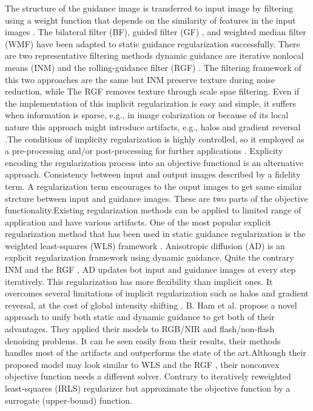 \documentclass[10pt,twocolumn,letterpaper]{article}
\begin{document}
	The structure of the guidance image is transferred to input image by filtering using a weight function that depends on the similarity of features in the input images \cite{Kopf:2007:JBU:1275808.1276497}. The bilateral filter (BF)\cite{tomasi1998bilateral}, guided filter (GF) \cite{he2013guided}, and weighted median filter (WMF) \cite{ma2013constant} have been adapted to static guidance regularization successfully. There are two representative filtering methods dynamic
	guidance are iterative nonlocal means (INM)  \cite{brox2008efficient} and the rolling-guidance filter (RGF) \cite{ham2015robust}. The filtering framework of this two approaches are the same but INM preserve texture during noise reduction, while The RGF removes texture through scale spae filtering. Even if the implementation of this implicit regularization is easy and simple, it suffers  when information is sparse, e.g., in image colarization \cite{levin2004colorization} or because of its local nature this approach might introduce artifacts, e.g., halos and gradient reversal  \cite{he2013guided}.The conditions  of implicity regularization is highly controlled, so it employed as a pre-processing and/or post-processing for further applications \cite{lang2012practical,ma2013constant}. Explicity encoding the regularization process into an objective functional is an alternative approach. Consistency between input and output images described by a fidelity term. A regularization term encourages to the ouput images to get same similar strcture between input and guidance images. These are two parts of the objective functionality.Existing regularization methods can be applied to limited range of application and have various artifacts. One of the most popular explicit regularization method that has been used  in static guidance regularization \cite{park2011high} is the weighted least-squares (WLS) framework \cite{farbman2008edge}. Anisotropic diffusion (AD) \cite{perona1990scale} is an explicit regularization framework using dynamic guidance. Quite the contrary INM \cite{brox2008efficient} and the RGF \cite{ham2015robust}, AD updates bot input and guidance images at every step iteratively. This regularization has more flexibility than implicit ones. It overcomes several limitations of implicit regularization such as halos and gradient reversal, at the cost of global intensity shifting \cite{farbman2008edge,he2013guided}.
	B. Ham et al. propose a novel approach to unify both static and dynamic guidance to get both of their advantages. They applied their models to RGB/NIR and flash/non-flash denoising problems. It can be seen easily from their results, their methods handles most of the artifacts and outperforms the state of the art.Although their proposed model may look similar to WLS \cite{farbman2008edge} and the RGF \cite{yan2013cross}, their nonconvex objective function needs a different solver. Contrary to iteratively reweighted least-squares (IRLS) \cite{daubechies2010iteratively} regularizer but approximate the objective function by a surrogate (upper-bound) function.
	
\end{document}

